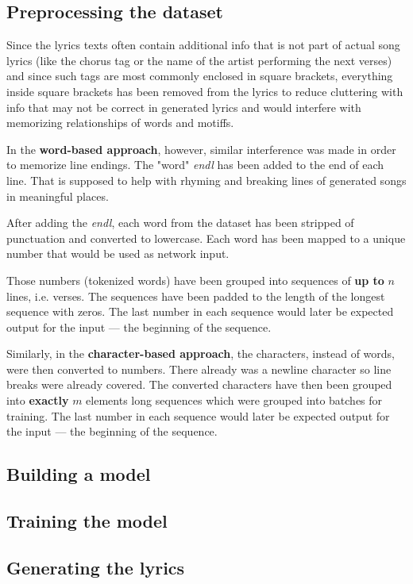 \documentclass[conference]{IEEEtran}
\begin{document}
\subsection{Preprocessing the dataset}
Since the lyrics texts often contain additional info that is not part of actual
song lyrics (like the chorus tag or the name of the artist performing the
next verses) and since such tags are most commonly enclosed in square brackets,
everything inside square brackets has been removed from the lyrics to
reduce cluttering with info that may not be correct in generated lyrics and
would interfere with memorizing relationships of words and motiffs.

In the \textbf{word-based approach}, however, similar interference was made in
order to memorize line endings. The "word" \textit{endl} has been added to the
end of each line. That is supposed to help with rhyming and breaking lines of
generated songs in meaningful places.

After adding the \textit{endl}, each word from the dataset has been stripped of
punctuation and converted to lowercase. Each word has been mapped to a unique
number that would be used as network input.

Those numbers (tokenized words) have been grouped into sequences of 
\textbf{up to} $n$ lines, i.e. verses. The sequences have been padded to the
length of the longest sequence with zeros. The last number in each sequence
would later be expected output for the input --- the beginning of the sequence.

Similarly, in the \textbf{character-based approach}, the characters, instead of
words, were then converted to numbers. There already was a newline character so
line breaks were already covered. The converted characters have then been
grouped into \textbf{exactly} $m$ elements long sequences which were grouped
into batches for training. The last number in each sequence would later be
expected output for the input --- the beginning of the sequence.


\subsection{Building a model}


\subsection{Training the model}

\subsection{Generating the lyrics}
\end{document}
